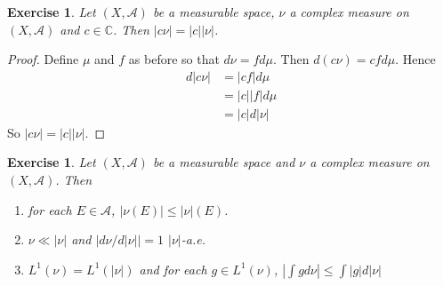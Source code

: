 \documentclass[12pt]{amsart}
\newtheorem{ex}[thm]{Exercise}
\newcommand{\C}{\mathbb{C}}
\newcommand{\MA}{\mathcal{A}}
\begin{document}
\begin{ex}
Let  $(X, \MA)$ be a measurable space, $\nu$ a complex measure on $(X, \MA)$ and $c \in \C$. Then $\vert c \nu \vert = \vert c \vert \vert \nu \vert$.
\end{ex}

\begin{proof}
Define $\mu$ and $f$ as before so that $d \nu = f d \mu$. Then $d (c \nu) = c f d \mu$. Hence 
\begin{align*}
d \vert c \nu \vert 
&= \vert cf \vert d \mu \\
&= \vert c \vert \vert f \vert d \mu\\
&= \vert c \vert d\vert \nu \vert
\end{align*}
So $\vert c \nu \vert = \vert c \vert \vert  \nu \vert$.
\end{proof}

\begin{ex}
Let $(X, \MA)$ be a measurable space and $\nu$ a complex measure on $(X, \MA)$. Then 

\begin{enumerate}
\item for each $E \in \MA$, $|\nu(E)| \leq |\nu|(E)$. 
\item $\nu \ll |\nu|$ and $\big|d \nu /d |\nu|\big| = 1$ $|\nu|$-a.e.
\item $L^1(\nu) = L^1(|\nu|)$ and for each $g \in L^1(\nu)$, $|\int g d\nu| \leq \int |g|d |\nu|$
\end{enumerate}
\end{ex}
\end{document}
